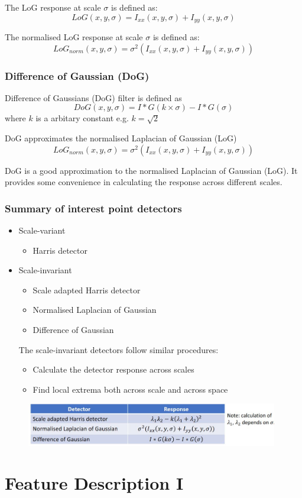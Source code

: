 \documentclass{report}
\begin{document}
The LoG response at scale $\sigma$ is defined as:
$$
    LoG(x,y,\sigma) = I_{xx}(x,y,\sigma) + I_{yy}(x,y,\sigma)
$$

The normalised LoG response at scale $\sigma$ is defined as:
$$
    LoG_{norm}(x,y,\sigma) = \sigma^2(I_{xx}(x,y,\sigma) + I_{yy}(x,y,\sigma))
$$

\subsection{Difference of Gaussian (DoG)}

Difference of Gaussians (DoG) filter is defined as
$$
    DoG(x,y,\sigma) = I * G(k \times \sigma) - I * G(\sigma)
$$
where $k$ is a arbitary constant e.g. $k=\sqrt{2}$

DoG approximates the normalised Laplacian of Gaussian (LoG)
$$
    LoG_{norm}(x,y,\sigma) = \sigma^2(I_{xx}(x,y,\sigma) + I_{yy}(x,y,\sigma))
$$

DoG is a good approximation to the normalised Laplacian of Gaussian (LoG). It
provides some convenience in calculating the response across different
scales. 

\subsection{Summary of interest point detectors}
\begin{itemize}
    \item Scale-variant
    \begin{itemize}
        \item Harris detector
    \end{itemize}

    \item Scale-invariant
    \begin{itemize}
        \item Scale adapted Harris detector
        \item Normalised Laplacian of Gaussian
        \item Difference of Gaussian
    \end{itemize}

    The scale-invariant detectors follow similar procedures:
    \begin{itemize}
        \item Calculate the detector response across scales
        \item Find local extrema both across scale and across space
    \end{itemize}
\end{itemize}

\begin{figure}[h]
    \centering
    \includegraphics[width=11cm]{Interest point summary.JPG}
\end{figure}

\chapter{Feature Description I}
\end{document}
